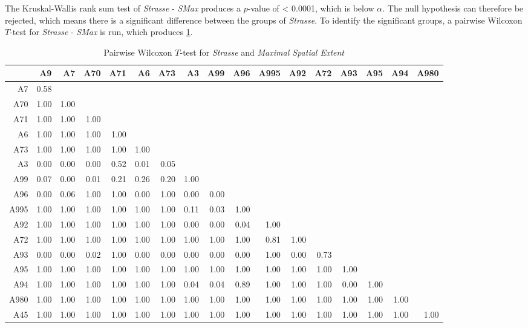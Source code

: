 The Kruskal-Wallis rank sum test of \textit{Strasse} - \textit{SMax} produces a $p$-value of < 0.0001, which is below $\alpha$. The null hypothesis can therefore be rejected, which means there is a significant difference between the groups of \textit{Strasse}. To identify the significant groups, a pairwise Wilcoxon $T$-test for \textit{Strasse} - \textit{SMax} is run, which produces \cref{tbl:wilcoxon_arbis_matched_Strasse_SMax}. 
\begin{table}[ht!]
	\tiny
	\setlength{\tabcolsep}{4pt}
	\centering
  \begin{tabular}{rrrrrrrrrrrrrrrrr}
    \toprule
         & A9 & A7 & A70 & A71 & A6 & A73 & A3 & A99 & A96 & A995 & A92 & A72 & A93 & A95 & A94 & A980 \\ 
    \hline
    A7   & 0.58 &  &  &  &  &  &  &  &  &  &  &  &  &  &  &  \\ 
    A70  & 1.00 & 1.00 &  &  &  &  &  &  &  &  &  &  &  &  &  &  \\ 
    A71  & 1.00 & 1.00 & 1.00 &  &  &  &  &  &  &  &  &  &  &  &  &  \\ 
    A6   & 1.00 & 1.00 & 1.00 & 1.00 &  &  &  &  &  &  &  &  &  &  &  &  \\ 
    A73  & 1.00 & 1.00 & 1.00 & 1.00 & 1.00 &  &  &  &  &  &  &  &  &  &  &  \\ 
    A3   & 0.00 & 0.00 & 0.00 & 0.52 & 0.01 & 0.05 &  &  &  &  &  &  &  &  &  &  \\ 
    A99  & 0.07 & 0.00 & 0.01 & 0.21 & 0.26 & 0.20 & 1.00 &  &  &  &  &  &  &  &  &  \\ 
    A96  & 0.00 & 0.06 & 1.00 & 1.00 & 0.00 & 1.00 & 0.00 & 0.00 &  &  &  &  &  &  &  &  \\ 
    A995 & 1.00 & 1.00 & 1.00 & 1.00 & 1.00 & 1.00 & 0.11 & 0.03 & 1.00 &  &  &  &  &  &  &  \\ 
    A92  & 1.00 & 1.00 & 1.00 & 1.00 & 1.00 & 1.00 & 0.00 & 0.00 & 0.04 & 1.00 &  &  &  &  &  &  \\ 
    A72  & 1.00 & 1.00 & 1.00 & 1.00 & 1.00 & 1.00 & 1.00 & 1.00 & 1.00 & 0.81 & 1.00 &  &  &  &  &  \\ 
    A93  & 0.00 & 0.00 & 0.02 & 1.00 & 0.00 & 0.00 & 0.00 & 0.00 & 0.00 & 1.00 & 0.00 & 0.73 &  &  &  &  \\ 
    A95  & 1.00 & 1.00 & 1.00 & 1.00 & 1.00 & 1.00 & 1.00 & 1.00 & 1.00 & 1.00 & 1.00 & 1.00 & 1.00 &  &  &  \\ 
    A94  & 1.00 & 1.00 & 1.00 & 1.00 & 1.00 & 1.00 & 0.04 & 0.04 & 0.89 & 1.00 & 1.00 & 1.00 & 0.00 & 1.00 &  &  \\ 
    A980 & 1.00 & 1.00 & 1.00 & 1.00 & 1.00 & 1.00 & 1.00 & 1.00 & 1.00 & 1.00 & 1.00 & 1.00 & 1.00 & 1.00 & 1.00 &  \\ 
    A45  & 1.00 & 1.00 & 1.00 & 1.00 & 1.00 & 1.00 & 1.00 & 1.00 & 1.00 & 1.00 & 1.00 & 1.00 & 1.00 & 1.00 & 1.00 & 1.00 \\ 
    \hline
  \end{tabular}
	\caption{Pairwise Wilcoxon $T$-test for \textit{Strasse} and \textit{Maximal Spatial Extent}}
	\label{tbl:wilcoxon_arbis_matched_Strasse_SMax}
\end{table}
